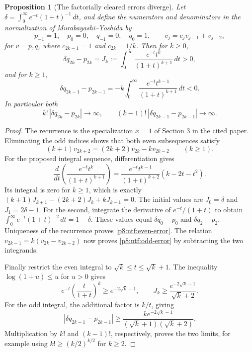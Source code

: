 \documentclass[11pt,a4paper]{article}
\newtheorem{proposition}[theorem]{Proposition}
\theoremstyle{definition}
\theoremstyle{remark}
\numberwithin{equation}{section}
\begin{document}
\begin{proposition}[The factorially cleared errors diverge]
\label{p8:ntf:laguerre-error}
Let $\delta=\int_0^\infty e^{-t}(1+t)^{-1}\,dt$, and define the
numerators and denominators in the normalization of
Murabayashi--Yoshida by
\[
 p_{-1}=1,\quad p_0=0,\quad q_{-1}=0,\quad q_0=1,
 \qquad v_j=c_jv_{j-1}+v_{j-2},
\]
for $v=p,q$, where $c_{2k-1}=1$ and $c_{2k}=1/k$.
Then for $k\geq0$,
\begin{equation}\label{p8:ntf:even-error}
 \delta q_{2k}-p_{2k}=J_k
      :=\int_0^\infty\frac{e^{-t}t^k}{(1+t)^{k+1}}\,dt>0,
\end{equation}
and for $k\geq1$,
\begin{equation}\label{p8:ntf:odd-error}
 \delta q_{2k-1}-p_{2k-1}
     =-k\int_0^\infty\frac{e^{-t}t^{k-1}}{(1+t)^{k+1}}\,dt<0.
\end{equation}
In particular both
\[
 k!\,|\delta q_{2k}-p_{2k}|\longrightarrow\infty,
 \qquad
 (k-1)!\,|\delta q_{2k-1}-p_{2k-1}|\longrightarrow\infty.
\]
\end{proposition}
\begin{proof}
The recurrence is the specialization $x=1$ of Section 3 in the
cited paper.  Eliminating the odd indices shows that both even
subsequences satisfy
\[
 (k+1)v_{2k+2}=(2k+2)v_{2k}-kv_{2k-2}\qquad(k\geq1).
\]
For the proposed integral sequence, differentiation gives
\[
 \frac{d}{dt}\left(\frac{e^{-t}t^k}{(1+t)^{k+1}}\right)
   =\frac{e^{-t}t^{k-1}}{(1+t)^{k+2}}(k-2t-t^2).
\]
Its integral is zero for $k\geq1$, which is exactly
$(k+1)J_{k+1}-(2k+2)J_k+kJ_{k-1}=0$.
The initial values are $J_0=\delta$ and $J_1=2\delta-1$.
For the second, integrate the derivative of $e^{-t}/(1+t)$
to obtain $\int_0^\infty e^{-t}(1+t)^{-2}\,dt=1-\delta$.
These values equal $\delta q_0-p_0$ and $\delta q_2-p_2$.
Uniqueness of the recurrence proves \eqref{p8:ntf:even-error}.
The relation $v_{2k-1}=k(v_{2k}-v_{2k-2})$ now proves
\eqref{p8:ntf:odd-error} by subtracting the two integrands.

Finally restrict the even integral to
$\sqrt{k}\leq t\leq\sqrt{k}+1$.  The inequality
$\log(1+u)\leq u$ for $u>0$ gives
\[
 e^{-t}\left(\frac{t}{1+t}\right)^k
       \geq e^{-2\sqrt{k}-1},\qquad
 J_k\geq\frac{e^{-2\sqrt{k}-1}}{\sqrt{k}+2}.
\]
For the odd integral, the additional factor is $k/t$, giving
\[
 |\delta q_{2k-1}-p_{2k-1}|
  \geq\frac{k e^{-2\sqrt{k}-1}}
               {(\sqrt{k}+1)(\sqrt{k}+2)}.
\]
Multiplication by $k!$ and $(k-1)!$, respectively, proves the two
limits, for example using $k!\geq(k/2)^{k/2}$ for $k\geq2$.
\end{proof}
\end{document}
